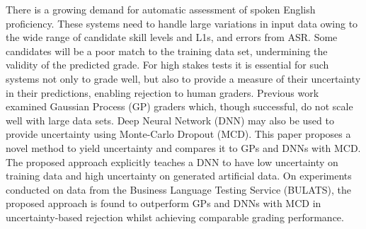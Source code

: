 There is a growing demand for automatic assessment of spoken English proficiency. These systems need to handle large variations in input data owing to the wide range of candidate skill levels and L1s, and errors from ASR. Some candidates will be a poor match to the training data set, undermining the validity of the predicted grade. For high stakes tests it is essential for such systems not only to grade well, but also to provide a measure of their uncertainty in their predictions, enabling rejection to human graders. Previous work examined Gaussian Process (GP) graders which, though successful, do not scale well with large data sets. Deep Neural Network (DNN) may also be used to provide uncertainty using Monte-Carlo Dropout (MCD). This paper proposes a novel method to yield uncertainty and compares it to GPs and DNNs with MCD. The proposed approach explicitly teaches a DNN to have low uncertainty on training data and high uncertainty on generated artificial data. On experiments conducted on data from the Business Language Testing Service (BULATS), the proposed approach is found to outperform GPs and DNNs with MCD in uncertainty-based rejection whilst achieving comparable grading performance.
